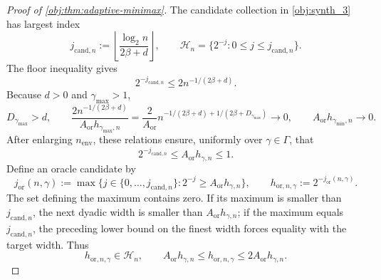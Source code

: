 \documentclass[11pt]{article}
\begin{document}
\begin{proof}[Proof of \cref{obj:thm:adaptive-minimax}]
The candidate collection in \cref{obj:synth_3} has largest index
\[
j_{\mathrm{cand},n}
:=\left\lfloor\frac{\log_2 n}{2\beta+d}\right\rfloor,
\qquad
\mathcal H_n=\{2^{-j}:0\le j\le j_{\mathrm{cand},n}\}.
\]
The floor inequality gives
\[
2^{-j_{\mathrm{cand},n}}
\le2n^{-1/(2\beta+d)}.
\]
Because \(d>0\) and \(\gamma_{\max}>1\),
\[
D_{\gamma_{\max}}>d,
\qquad
\frac{2n^{-1/(2\beta+d)}}{A_{\mathrm{or}}h_{\gamma_{\max},n}}
=\frac2{A_{\mathrm{or}}}
 n^{-1/(2\beta+d)+1/(2\beta+D_{\gamma_{\max}})}
\longrightarrow0,
\qquad
A_{\mathrm{or}}h_{\gamma_{\min},n}\longrightarrow0.
\]
After enlarging \(n_{\mathrm{env}}\), these relations ensure, uniformly over \(\gamma\in\Gamma\), that
\[
2^{-j_{\mathrm{cand},n}}
\le A_{\mathrm{or}}h_{\gamma,n}\le1.
\]
Define an oracle candidate by
\[
j_{\mathrm{or}}(n,\gamma)
:=\max\{j\in\{0,\ldots,j_{\mathrm{cand},n}\}:
2^{-j}\ge A_{\mathrm{or}}h_{\gamma,n}\},
\qquad
h_{\mathrm{or},n,\gamma}:=2^{-j_{\mathrm{or}}(n,\gamma)}.
\]
The set defining the maximum contains zero. If its maximum is smaller than \(j_{\mathrm{cand},n}\), the next dyadic width is smaller than \(A_{\mathrm{or}}h_{\gamma,n}\); if the maximum equals \(j_{\mathrm{cand},n}\), the preceding lower bound on the finest width forces equality with the target width. Thus
\[
h_{\mathrm{or},n,\gamma}\in\mathcal H_n,
\qquad
A_{\mathrm{or}}h_{\gamma,n}
\le h_{\mathrm{or},n,\gamma}
\le2A_{\mathrm{or}}h_{\gamma,n}.
\]


\end{proof}
\end{document}
